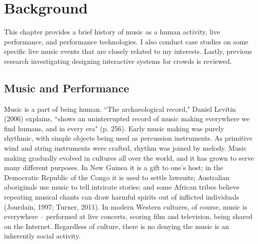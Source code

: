 \chapter{Background}

This chapter provides a brief history of music as a human activity, live performance, and performance technologies. I also conduct case studies on some specific live music events that are closely related to my interests. Lastly, previous research investigating designing interactive systems for crowds is reviewed.

\section{Music and Performance}

Music is a part of being human. ``The archaeological record," Daniel Levitin (2006) explains, ``shows an uninterrupted record of music making everywhere we find humans, and in every era" (p. 256). Early music making was purely rhythmic, with simple objects being used as percussion instruments. As primitive wind and string instruments were crafted, rhythm was joined by melody. Music making gradually evolved in cultures all over the world, and it has grown to serve many different purposes. In New Guinea it is a gift to one's host; in the Democratic Republic of the Congo it is used to settle lawsuits; Australian aboriginals use music to tell intricate stories; and some African tribes believe repeating musical chants can draw harmful spirits out of inflicted individuals (Jourdain, 1997; Turner, 2011). In modern Western cultures, of course, music is everywhere -- performed at live concerts, scoring film and television, being shared on the Internet. Regardless of culture, there is no denying the music is an inherently social activity.

